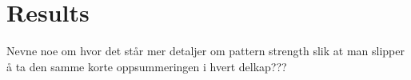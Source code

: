 \chapter{Results}\label{chap:results}

	Nevne noe om hvor det står mer detaljer om pattern strength slik at man slipper å ta den samme korte oppsummeringen i hvert delkap???

	